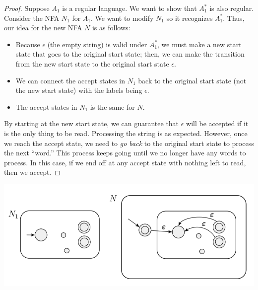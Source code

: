 \documentclass[letterpaper]{article}
\begin{document}
\begin{mdframed}[]
    \begin{proof}
        Suppose $A_1$ is a regular language. We want to show that $A_1^*$ is also regular. Consider the NFA $N_1$ for $A_1$. We want to modify $N_1$ so it recognizes $A_1^*$. Thus, our idea for the new NFA $N$ is as follows: 
        \begin{itemize}
            \item Because $\epsilon$ (the empty string) is valid under $A_1^*$, we must make a new start state that goes to the original start state; then, we can make the transition from the new start state to the original start state $\epsilon$. 
            \item We can connect the accept states in $N_1$ back to the original start state (not the new start state) with the labels being $\epsilon$.
            \item The accept states in $N_1$ is the same for $N$. 
        \end{itemize}
        By starting at the new start state, we can guarantee that $\epsilon$ will be accepted if it is the only thing to be read. Processing the string is as expected. However, once we reach the accept state, we need to \emph{go back} to the original start state to process the next ``word.'' This process keeps going until we no longer have any words to process. In this case, if we end off at any accept state with nothing left to read, then we accept. 
    \end{proof}
\end{mdframed}

\begin{center}
    \includegraphics[scale=0.5]{../assets/star_nfa.png}
\end{center}
\end{document}
